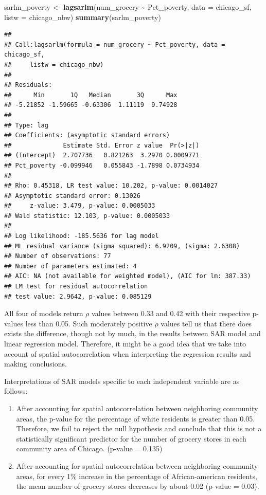 \documentclass[
]{article}
\newenvironment{Shaded}{\begin{snugshade}}{\end{snugshade}}
\newcommand{\AttributeTok}[1]{\textcolor[rgb]{0.13,0.29,0.53}{#1}}
\newcommand{\FunctionTok}[1]{\textcolor[rgb]{0.13,0.29,0.53}{\textbf{#1}}}
\newcommand{\NormalTok}[1]{#1}
\newcommand{\OtherTok}[1]{\textcolor[rgb]{0.56,0.35,0.01}{#1}}
\newcommand{\SpecialCharTok}[1]{\textcolor[rgb]{0.81,0.36,0.00}{\textbf{#1}}}
\begin{document}
\begin{Shaded}
\begin{Highlighting}[]
\NormalTok{sarlm\_poverty }\OtherTok{\textless{}{-}} \FunctionTok{lagsarlm}\NormalTok{(num\_grocery }\SpecialCharTok{\textasciitilde{}}\NormalTok{ Pct\_poverty, }\AttributeTok{data =}\NormalTok{ chicago\_sf, }\AttributeTok{listw =}\NormalTok{ chicago\_nbw)}
\FunctionTok{summary}\NormalTok{(sarlm\_poverty)}
\end{Highlighting}
\end{Shaded}

\begin{verbatim}
## 
## Call:lagsarlm(formula = num_grocery ~ Pct_poverty, data = chicago_sf, 
##     listw = chicago_nbw)
## 
## Residuals:
##      Min       1Q   Median       3Q      Max 
## -5.21852 -1.59665 -0.63306  1.11119  9.74928 
## 
## Type: lag 
## Coefficients: (asymptotic standard errors) 
##              Estimate Std. Error z value  Pr(>|z|)
## (Intercept)  2.707736   0.821263  3.2970 0.0009771
## Pct_poverty -0.099946   0.055843 -1.7898 0.0734934
## 
## Rho: 0.45318, LR test value: 10.202, p-value: 0.0014027
## Asymptotic standard error: 0.13026
##     z-value: 3.479, p-value: 0.0005033
## Wald statistic: 12.103, p-value: 0.0005033
## 
## Log likelihood: -185.5636 for lag model
## ML residual variance (sigma squared): 6.9209, (sigma: 2.6308)
## Number of observations: 77 
## Number of parameters estimated: 4 
## AIC: NA (not available for weighted model), (AIC for lm: 387.33)
## LM test for residual autocorrelation
## test value: 2.9642, p-value: 0.085129
\end{verbatim}

All four of models return \(\rho\) values between 0.33 and 0.42 with
their respective p-values less than 0.05. Such moderately positive
\(\rho\) values tell us that there does exists the difference, though
not by much, in the results between SAR model and linear regression
model. Therefore, it might be a good idea that we take into account of
spatial autocorrelation when interpreting the regression results and
making conclusions.

Interpretations of SAR models specific to each independent variable are
as follows:

\begin{enumerate}
\def\labelenumi{\arabic{enumi}.}
\item
  After accounting for spatial autocorrelation between neighboring
  community areas, the p-value for the percentage of white residents is
  greater than 0.05. Therefore, we fail to reject the null hypothesis
  and conclude that this is not a statistically significant predictor
  for the number of grocery stores in each community area of Chicago.
  (p-value = 0.135)\\
\item
  After accounting for spatial autocorrelation between neighboring
  community areas, for every 1\% increase in the percentage of
  African-american residents, the mean number of grocery stores
  decreases by about 0.02 (p-value = 0.03).\\
\end{enumerate}
\end{document}
